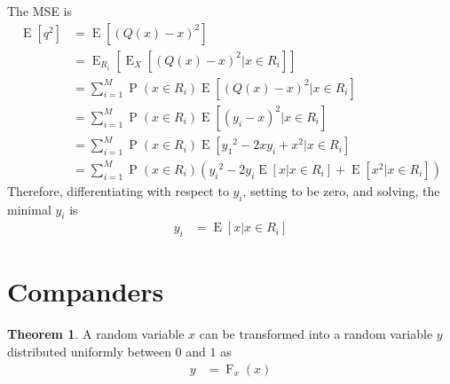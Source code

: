 \documentclass[titlepage, fleqn, a4paper, 12pt, twoside]{article}
\theoremstyle{definition}
\theoremstyle{theorem}
\newtheorem{theorem}{Theorem}
\DeclareMathOperator{\cdf}{\mathrm{F}}
\DeclareMathOperator{\prob}{\mathrm{P}}
\DeclareMathOperator{\expct}{\mathrm{E}}
\begin{document}
\begin{solution}
	The MSE is
	\begin{align*}
		\expct\left[ q^2 \right] &= \expct\left[ \left( Q(x) - x \right)^2 \right]\\
		&= \expct_{R_i}\left[ \expct_X\left[ \left( Q(x) - x \right)^2 \Big| x \in R_i \right] \right]\\
		&= \sum\limits_{i = 1}^{M} \prob(x \in R_i) \expct\left[ \left( Q(x) - x \right)^2 \Big| x \in R_i \right]\\
		&= \sum\limits_{i = 1}^{M} \prob(x \in R_i) \expct\left[ (y_i - x)^2 \Big| x \in R_i \right]\\
		&= \sum\limits_{i = 1}^{M} \prob(x \in R_i) \expct\left[ {y_1}^2 - 2 x y_i + x^2 \Big| x \in R_i \right]\\
		&= \sum\limits_{i = 1}^{M} \prob(x \in R_i) \left( {y_i}^2 - 2 y_i \expct[x | x \in R_i] + \expct\left[ x^2 \Big| x \in R_i \right] \right)
	\end{align*}
	Therefore, differentiating with respect to $y_i$, setting to be zero, and solving, the minimal $y_i$ is
	\begin{align*}
		y_i &= \expct[x | x \in R_i]
	\end{align*}
\end{solution}

\section{Companders}

\begin{theorem}
	A random variable $x$ can be transformed into a random variable $y$ distributed uniformly between $0$ and $1$ as
	\begin{align*}
		y &= \cdf_x(x)
	\end{align*}
\end{theorem}
\end{document}
